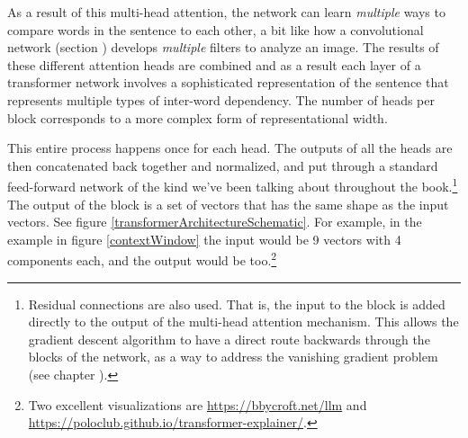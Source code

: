 
As a result of this multi-head attention, the network can learn \emph{multiple} ways to compare words in the sentence to each other, a bit like how a convolutional network (section ) develops \emph{multiple} filters to analyze an image. The results of these different attention heads are combined and as a result each layer of a transformer network involves a sophisticated representation of the sentence that represents multiple types of inter-word dependency. The number of heads per block corresponds to a more complex form of representational width.

This entire process happens once for each head. The outputs of all the heads are then concatenated back together and normalized, and put through a standard feed-forward network of the kind we've been talking about throughout the book.\footnote{Residual connections are also used. That is, the input to the block is added directly to the output of the multi-head attention mechanism. This allows the gradient descent algorithm to have a direct route backwards through the blocks of the network, as a way to address the vanishing gradient problem (see chapter ). }  The output of the block is a set of vectors that has the same shape as the input vectors. See figure \ref{transformerArchitectureSchematic}. For example, in the example in figure \ref{contextWindow} the input would be 9 vectors with 4 components each, and the output would be too.\footnote{Two excellent visualizations are \url{https://bbycroft.net/llm} and \url{https://poloclub.github.io/transformer-explainer/}.}

